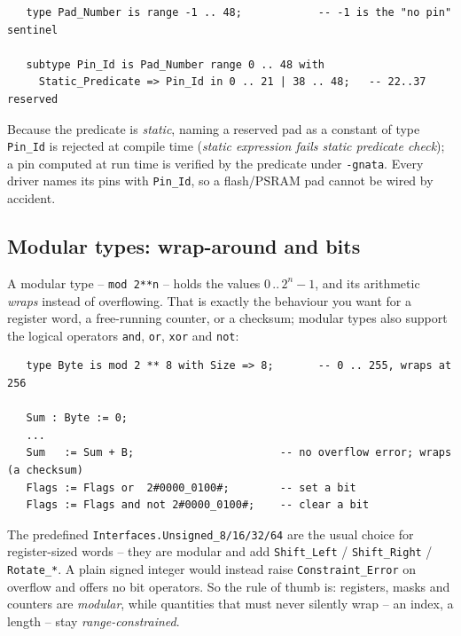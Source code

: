 \begin{lstlisting}
   type Pad_Number is range -1 .. 48;            -- -1 is the "no pin" sentinel

   subtype Pin_Id is Pad_Number range 0 .. 48 with
     Static_Predicate => Pin_Id in 0 .. 21 | 38 .. 48;   -- 22..37 reserved
\end{lstlisting}

Because the predicate is \emph{static}, naming a reserved pad as a constant of
type \texttt{Pin\_Id} is rejected at compile time (\emph{static expression fails
static predicate check}); a pin computed at run time is verified by the predicate
under \texttt{-gnata}. Every driver names its pins with \texttt{Pin\_Id}, so a
flash/PSRAM pad cannot be wired by accident.


\subsection{Modular types: wrap-around and bits}

A modular type -- \texttt{mod 2**n} -- holds the values $0\,..\,2^n-1$, and its
arithmetic \emph{wraps} instead of overflowing. That is exactly the behaviour you
want for a register word, a free-running counter, or a checksum; modular types
also support the logical operators \texttt{and}, \texttt{or}, \texttt{xor} and
\texttt{not}:

\begin{lstlisting}
   type Byte is mod 2 ** 8 with Size => 8;       -- 0 .. 255, wraps at 256

   Sum : Byte := 0;
   ...
   Sum   := Sum + B;                       -- no overflow error; wraps (a checksum)
   Flags := Flags or  2#0000_0100#;        -- set a bit
   Flags := Flags and not 2#0000_0100#;    -- clear a bit
\end{lstlisting}

The predefined \texttt{Interfaces.Unsigned\_8/16/32/64} are the usual choice for
register-sized words -- they are modular and add \texttt{Shift\_Left} /
\texttt{Shift\_Right} / \texttt{Rotate\_*}. A plain signed integer would instead
raise \texttt{Constraint\_Error} on overflow and offers no bit operators. So the
rule of thumb is: registers, masks and counters are \emph{modular}, while
quantities that must never silently wrap -- an index, a length -- stay
\emph{range-constrained}.


